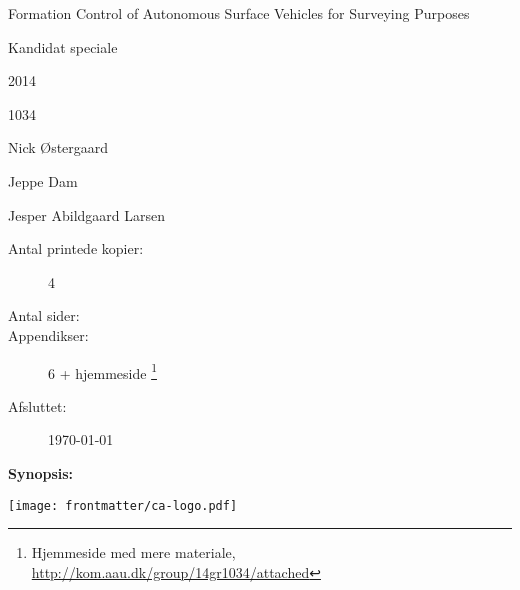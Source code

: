 \begin{minipage}[c]{0.45\textwidth}
	\begin{description}[leftmargin=\parindent+0.5em,labelindent=\parindent]
	\item [\textbf{Titel:}] \tightlist
	\item Formation Control of Autonomous Surface Vehicles for Surveying Purposes
	\end{description}

	\begin{description}
	\item [\textbf{Tema:}] \tightlist
	\item Kandidat speciale
	\end{description}

	\begin{description}
	\item[Projektperiode:] \tightlist
	\item 2014
	\end{description}
	\begin{description}
	\item[Projektgruppe:] \tightlist
	\item 1034
	\end{description}

	\begin{description}
	\item[Deltagere:] \tightlist
	\item Nick \O stergaard 
	\item Jeppe Dam
	\end{description} 

	\begin{description}
	\item[Vejleder:] \tightlist
	\item Jesper Abildgaard Larsen
	\end{description}

	\begin{description}
	\item[Antal printede kopier:] 4
	\item[Antal sider:] \arabic{lastsheet} 
	\item[Appendikser:] 6 + hjemmeside
		\footnote{Hjemmeside med mere materiale, \url{http://kom.aau.dk/group/14gr1034/attached}}
	\item[Afsluttet:] \today
	\end{description}
\end{minipage}
\hfill
\begin{minipage}[r]{0.50\textwidth}
	{\textbf{Synopsis:}} \\
	\fbox{\parbox[c]{\textwidth-0.5em}{
	\bigskip
	{\vfill{\small 
	\bigskip}}
    }}
\end{minipage}
\vfill
\begin{center}
	\texttt{[image: frontmatter/ca-logo.pdf]}
\end{center}
\restoregeometry

